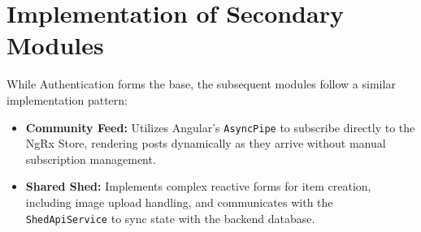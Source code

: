 \section{Implementation of Secondary Modules}
While Authentication forms the base, the subsequent modules follow a similar implementation pattern:
\begin{itemize}
    \item \textbf{Community Feed:} Utilizes Angular's \texttt{AsyncPipe} to subscribe directly to the NgRx Store, rendering posts dynamically as they arrive without manual subscription management.
    \item \textbf{Shared Shed:} Implements complex reactive forms for item creation, including image upload handling, and communicates with the \texttt{ShedApiService} to sync state with the backend database.
\end{itemize}
